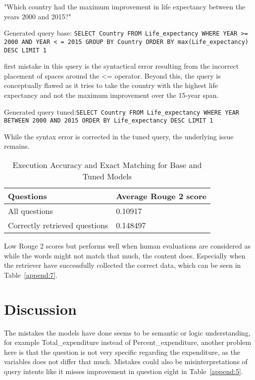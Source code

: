 \documentclass[11pt]{article}
\begin{document}
"Which country had the maximum improvement in life expectancy between the years 2000 and 2015?"

Generated query base: \texttt{SELECT Country FROM Life\_expectancy WHERE YEAR >= 2000 AND YEAR < = 2015 GROUP BY Country ORDER BY max(Life\_expectancy) DESC LIMIT 1}

 first mistake in this query is the syntactical error resulting from the incorrect placement of spaces around the <= operator. Beyond this, the query is conceptually flawed as it tries to take the country with the highest life expectancy and not the maximum improvement over the 15-year span.

Generated query tuned:\texttt{SELECT Country FROM Life\_expectancy WHERE YEAR BETWEEN 2000 AND 2015 ORDER BY Life\_expectancy DESC LIMIT 1}

While the syntax error is corrected in the tuned query, the underlying issue remains. 



\begin{table}[h!]
\centering
\begin{tabular}{|p{}|p{}|}
\hline
\textbf{Questions} & \textbf{Average Rouge 2 score} \\ \hline
All questions           & 0.10917                   \\ \hline
Correctly retrieved questions          & 0.148497         \\ \hline          
\end{tabular}
\caption{Execution Accuracy and Exact Matching for Base and Tuned Models}
\label{tab:Rouge}
\end{table}

Low Rouge 2 scores but performs well when human evaluations are considered as while the words might not match that much, the content does. Especially when the retriever have successfully collected the correct data, which can be seen in Table~\ref{append:7}.

\section{Discussion}

The mistakes the models have done seems to be semantic or logic understanding, for example Total\_expenditure instead of Percent\_expenditure, another problem here is that the question is not very specific regarding the expenditure, as the variables does not differ that much. Mistakes could also be misinterpretations of query intents like it misses improvement in question eight in Table~\ref{append:5}.
\end{document}
